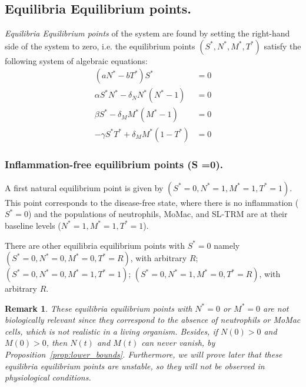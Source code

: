 \documentclass[a4paper, 12pt]{article}
\newtheorem{rem}{Remark}[section]
\providecommand{\DIFaddtex}[1]{{\protect\color{blue} \sf #1}} %
\providecommand{\DIFdeltex}[1]{{\protect\color{red} \scriptsize #1}} %
\providecommand{\DIFaddbegin}{} %
\providecommand{\DIFaddend}{} %
\providecommand{\DIFdelbegin}{} %
\providecommand{\DIFdelend}{} %
\providecommand{\DIFadd}[1]{\texorpdfstring{\DIFaddtex{#1}}{#1}} %
\providecommand{\DIFdel}[1]{\texorpdfstring{\DIFdeltex{#1}}{}} %
\begin{document}
\subsection{\DIFdelbegin \DIFdel{Equilibria }\DIFdelend \DIFaddbegin \DIFadd{Equilibrium }\DIFaddend points.}
\emph{\DIFdelbegin \DIFdel{Equilibria }\DIFdelend \DIFaddbegin \DIFadd{Equilibrium }\DIFaddend points} of the system are found by setting the right-hand side of the system to zero, i.e.
 the equilibrium points $(S^*, N^*, M^*, T^*)$ satisfy the following system of algebraic equations:
\begin{align}
(a N^* - b T^*) S^* &= 0 \label{eq:equilibrium_S} \\
\alpha S^* N^* - \delta_N N^* (N^* - 1) &= 0 \label{eq:equilibrium_N} \\
\beta S^* - \delta_M M^* (M^* - 1) &= 0 \label{eq:equilibrium_M} \\
-\gamma S^* T^* + \delta_M M^* (1 - T^*) &= 0 \label{eq:equilibrium_T}
\end{align}
\subsubsection{Inflammation-free equilibrium points (S =0).}\label{sec:disease_free}
A first natural equilibrium point is given by $(S^* = 0, N^* = 1, M^* = 1, T^* = 1)$. This point corresponds to the disease-free state, where there is no inflammation ($S^* = 0$) and the populations of neutrophils, MoMac, and SL-TRM are at their baseline    levels ($N^* = 1, M^* = 1, T^* = 1$).

There are other \DIFdelbegin \DIFdel{equilibria }\DIFdelend \DIFaddbegin \DIFadd{equilibrium }\DIFaddend points with $S^* = 0$  namely
$(S^* = 0, N^* = 0, M^* = 0, T^* = R)$, with arbitrary $R$;
 $(S^* = 0, N^* = 0, M^* = 1, T^* = 1)$;
 $(S^* = 0, N^* = 1, M^* = 0, T^* = R)$, with arbitrary $R$.
\begin{rem}\label{rem:vanishing}
These \DIFdelbegin \DIFdel{equilibria }\DIFdelend \DIFaddbegin \DIFadd{equilibrium }\DIFaddend points with  $N^* = 0$ or $M^* = 0$ are not biologically relevant since they correspond to the absence of neutrophils or MoMac cells, which is not realistic in a living organism.
\DIFaddbegin \DIFadd{Besides, if $N(0) > 0$ and $M(0) > 0$, then $N(t)$ and $M(t)$ can never vanish, by Proposition~\ref{prop:lower_bounds}.
}\DIFaddend Furthermore, we will prove later that these \DIFdelbegin \DIFdel{equilibria }\DIFdelend \DIFaddbegin \DIFadd{equilibrium }\DIFaddend points are unstable, so they will not be observed in physiological conditions.
\end{rem}
\DIFdelbegin %
\end{document}

